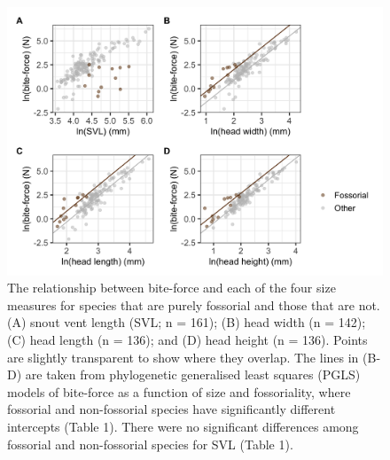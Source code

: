 \documentclass[a4paper, 12pt]{article}
\begin{document}
\newpage
\begin{figure}[h]
 \centering
  \includegraphics[width = \linewidth]{figures/bodysize-bite-force-fossorial.png}
  \caption{The relationship between bite-force and each of the four size measures for species that are purely fossorial and those that are not. 
  (A) snout vent length (SVL; n = 161); (B) head width (n = 142); (C) head length (n = 136); and (D) head height (n = 136). 
  Points are slightly transparent to show where they overlap. 
  The lines in (B-D) are taken from phylogenetic generalised least squares (PGLS) models of bite-force as a function of size and fossoriality, where fossorial and non-fossorial species have significantly different intercepts (Table 1). 
  There were no significant differences among fossorial and non-fossorial species for SVL (Table 1). 
}
  \label{fig-fossorial}
\end{figure}
\end{document}

